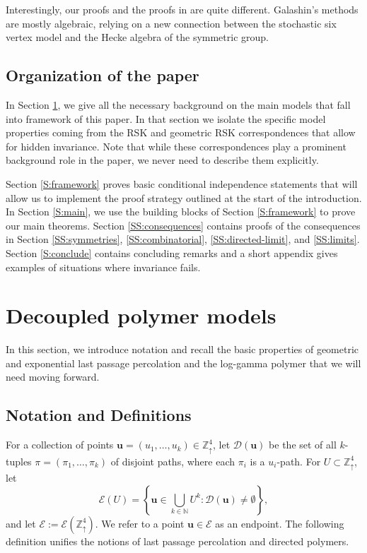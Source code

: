 \documentclass[aop, preprint]{imsart}
\theoremstyle{plain}
\theoremstyle{definition}
\theoremstyle{plain}
\newcommand{\N}{\mathbb{N}}
\newcommand{\sset}{\subset}
\newcommand{\scrE}{\mathcal{E}}
\newcommand{\Zd}{\mathds{Z}^4_\uparrow}
\newcommand{\scrD}{\mathcal{D}}
\newcommand{\lf}{\left}
\newcommand{\rg}{\right}
\newcommand{\bu}{\mathbf{u}}
\begin{document}
Interestingly, our proofs and the proofs in \cite{galashin2020symmetries} are quite different. Galashin's methods are mostly algebraic, relying on a new connection between the stochastic six vertex model and the Hecke algebra of the symmetric group.

\subsection{Organization of the paper}



In Section \ref{S:prelim}, we give all the necessary background on the main models that fall into framework of this paper. In that section we isolate the specific model properties coming from the RSK and geometric RSK correspondences that allow for hidden invariance. Note that while these correspondences play a prominent background role in the paper, we never need to describe them explicitly. 

Section \ref{S:framework} proves basic conditional independence statements that will allow us to implement the proof strategy outlined at the start of the introduction. In Section \ref{S:main}, we use the building blocks of Section \ref{S:framework} to prove our main theorems.
Section \ref{SS:consequences} contains proofs of the consequences in Section \ref{SS:symmetries}, \ref{SS:combinatorial}, \ref{SS:directed-limit}, and \ref{SS:limits}. Section \ref{S:conclude} contains concluding remarks and a short appendix gives examples of situations where invariance fails.

\section{Decoupled polymer models}
\label{S:prelim}

In this section, we introduce notation and recall the basic properties of geometric and exponential last passage percolation and the log-gamma polymer that we will need moving forward.

\subsection{Notation and Definitions}
For a collection of points $\bu = (u_1, \dots, u_k) \in \Zd$, let 
$
\scrD(\bu)
$
be the set of all $k$-tuples $\pi = (\pi_1, \dots, \pi_k)$ of disjoint paths, where each $\pi_i$ is a $u_i$-path. For $U \sset \Zd$, let 
$$
\scrE(U) = \lf\{\bu \in \bigcup_{k \in \N} U^k : \scrD(\bu) \ne \emptyset \rg\},
$$
and let $\scrE := \scrE(\Zd)$. We refer to a point $\bu \in \scrE$ as an endpoint.
The following definition unifies the notions of last passage percolation and directed polymers.
\end{document}
